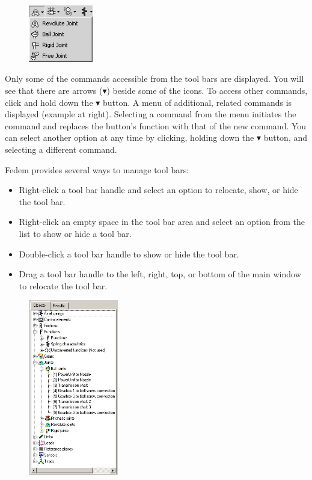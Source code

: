 
\begin{figure}
  \includegraphics[width=0.25\textwidth]{Figures/1st_Joint_Pulldown}
\end{figure}

Only some of the commands accessible from the tool bars are displayed. You will
see that there are arrows ($\blacktriangledown$) beside some of the icons.
To access other commands, click and hold down the $\blacktriangledown$ button.
A menu of additional, related commands is displayed (example at right).
Selecting a command from the menu initiates the command and replaces the
button’s function with that of the new command. You can select another
option at any time by clicking, holding down the $\blacktriangledown$ button,
and selecting a different command.

\clearpage
Fedem provides several ways to manage tool bars:

\begin{itemize}
\item Right-click a tool bar handle and select an option
  to relocate, show, or hide the tool bar.
\item Right-click an empty space in the tool bar area and select
  an option from the list to show or hide a tool bar.
\item Double-click a tool bar handle to show or hide the tool bar.
\item Drag a tool bar handle to the left, right, top, or bottom of
  the main window to relocate the tool bar.
\end{itemize}



\begin{figure}
  \includegraphics[width=0.35\textwidth]{Figures/2-ModelManager}
\end{figure}

